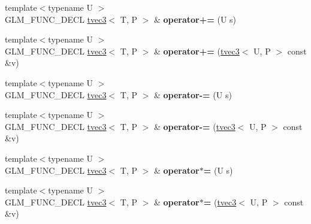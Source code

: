 \begin{DoxyCompactItemize}
\item 
{\footnotesize template$<$typename U $>$ }\\G\+L\+M\+\_\+\+F\+U\+N\+C\+\_\+\+D\+E\+CL \hyperlink{structglm_1_1detail_1_1tvec3}{tvec3}$<$ T, P $>$ \& {\bfseries operator+=} (U s)\hypertarget{structglm_1_1detail_1_1tvec3_a1c2a116b686e23bab8fae7780950ef38}{}\label{structglm_1_1detail_1_1tvec3_a1c2a116b686e23bab8fae7780950ef38}

\item 
{\footnotesize template$<$typename U $>$ }\\G\+L\+M\+\_\+\+F\+U\+N\+C\+\_\+\+D\+E\+CL \hyperlink{structglm_1_1detail_1_1tvec3}{tvec3}$<$ T, P $>$ \& {\bfseries operator+=} (\hyperlink{structglm_1_1detail_1_1tvec3}{tvec3}$<$ U, P $>$ const \&v)\hypertarget{structglm_1_1detail_1_1tvec3_a9bd5c6f729076573c980b70cc16a429b}{}\label{structglm_1_1detail_1_1tvec3_a9bd5c6f729076573c980b70cc16a429b}

\item 
{\footnotesize template$<$typename U $>$ }\\G\+L\+M\+\_\+\+F\+U\+N\+C\+\_\+\+D\+E\+CL \hyperlink{structglm_1_1detail_1_1tvec3}{tvec3}$<$ T, P $>$ \& {\bfseries operator-\/=} (U s)\hypertarget{structglm_1_1detail_1_1tvec3_aafbf3f712a6add1677828784286ab62d}{}\label{structglm_1_1detail_1_1tvec3_aafbf3f712a6add1677828784286ab62d}

\item 
{\footnotesize template$<$typename U $>$ }\\G\+L\+M\+\_\+\+F\+U\+N\+C\+\_\+\+D\+E\+CL \hyperlink{structglm_1_1detail_1_1tvec3}{tvec3}$<$ T, P $>$ \& {\bfseries operator-\/=} (\hyperlink{structglm_1_1detail_1_1tvec3}{tvec3}$<$ U, P $>$ const \&v)\hypertarget{structglm_1_1detail_1_1tvec3_a9cb33db5b994eea9724fdd8c30b08873}{}\label{structglm_1_1detail_1_1tvec3_a9cb33db5b994eea9724fdd8c30b08873}

\item 
{\footnotesize template$<$typename U $>$ }\\G\+L\+M\+\_\+\+F\+U\+N\+C\+\_\+\+D\+E\+CL \hyperlink{structglm_1_1detail_1_1tvec3}{tvec3}$<$ T, P $>$ \& {\bfseries operator$\ast$=} (U s)\hypertarget{structglm_1_1detail_1_1tvec3_a414982cd74a45512de204d72ea147c46}{}\label{structglm_1_1detail_1_1tvec3_a414982cd74a45512de204d72ea147c46}

\item 
{\footnotesize template$<$typename U $>$ }\\G\+L\+M\+\_\+\+F\+U\+N\+C\+\_\+\+D\+E\+CL \hyperlink{structglm_1_1detail_1_1tvec3}{tvec3}$<$ T, P $>$ \& {\bfseries operator$\ast$=} (\hyperlink{structglm_1_1detail_1_1tvec3}{tvec3}$<$ U, P $>$ const \&v)\hypertarget{structglm_1_1detail_1_1tvec3_aac5ebc20b3a00cdd090b9320186b18c2}{}\label{structglm_1_1detail_1_1tvec3_aac5ebc20b3a00cdd090b9320186b18c2}


\end{DoxyCompactItemize}

